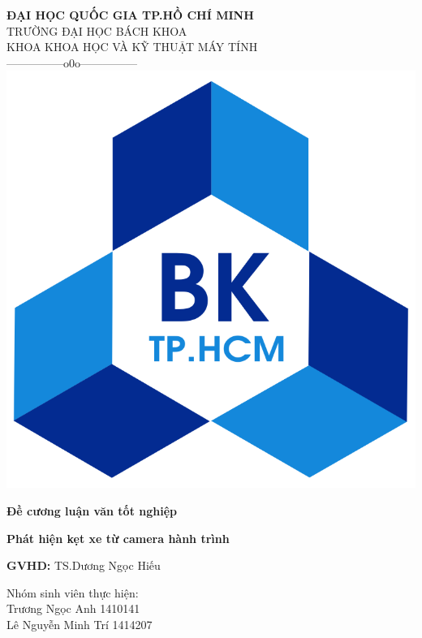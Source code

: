 \documentclass[12pt]{report}
\begin{document}
\begin{center}
	\textbf{ĐẠI HỌC QUỐC GIA TP.HỒ CHÍ MINH}\\
	TRƯỜNG ĐẠI HỌC BÁCH KHOA\\
	KHOA KHOA HỌC VÀ KỸ THUẬT MÁY TÍNH\\
	---------------o0o--------------- \\
	\vspace{5mm}
	\includegraphics[scale=0.2]{charts/logo.png}
\end{center}
\vspace{5mm}

\begin{center}
	\textbf{Đề cương luận văn tốt nghiệp}
\end{center}

\textbf{\Large Phát hiện kẹt xe từ camera hành trình}

\vspace{5mm}

\textbf{GVHD: } TS.Dương Ngọc Hiếu

\vspace{5mm}

Nhóm sinh viên thực hiện:\\
 Trương Ngọc Anh  1410141 \\
 Lê Nguyễn Minh Trí  1414207 \\
 
\end{document}
